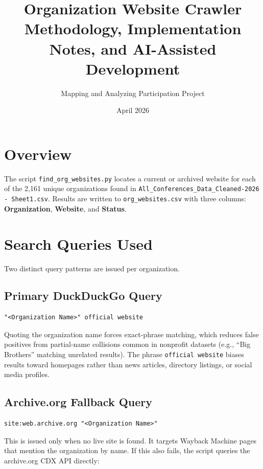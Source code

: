 \documentclass[12pt]{article}
\title{Organization Website Crawler\\
\large Methodology, Implementation Notes, and AI-Assisted Development}
\author{Mapping and Analyzing Participation Project}
\date{April 2026}
\begin{document}
\maketitle

\section{Overview}

The script \texttt{find\_org\_websites.py} locates a current or archived website
for each of the 2,161 unique organizations found in
\texttt{All\_Conferences\_Data\_Cleaned-2026 - Sheet1.csv}.
Results are written to \texttt{org\_websites.csv} with three columns:
\textbf{Organization}, \textbf{Website}, and \textbf{Status}.

\section{Search Queries Used}

Two distinct query patterns are issued per organization.

\subsection{Primary DuckDuckGo Query}

\begin{lstlisting}
"<Organization Name>" official website
\end{lstlisting}

Quoting the organization name forces exact-phrase matching, which reduces
false positives from partial-name collisions common in nonprofit datasets
(e.g., ``Big Brothers'' matching unrelated results). The phrase
\texttt{official website} biases results toward homepages rather than
news articles, directory listings, or social media profiles.

\subsection{Archive.org Fallback Query}

\begin{lstlisting}
site:web.archive.org "<Organization Name>"
\end{lstlisting}

This is issued only when no live site is found. It targets Wayback Machine
pages that mention the organization by name. If this also fails, the script
queries the archive.org CDX API directly:
\end{document}

